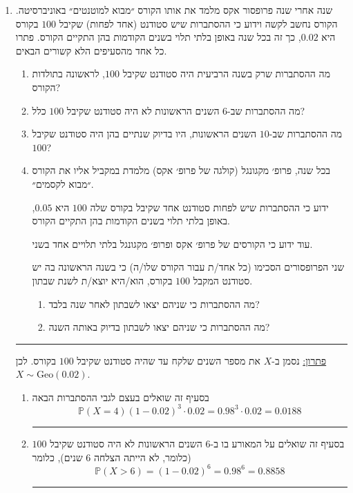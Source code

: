 \documentclass[12pt, a4paper]{article}
\newcommand{\PP}{\mathbb{P}}
\newcommand{\Geo}{\mathrm{Geo}}
\begin{document}
\begin{enumerate}

\item
שנה אחרי שנה פרופסור אקס מלמד את אותו הקורס ״מבוא למוטנטים״ באוניברסיטה.  
הקורס נחשב לקשה וידוע כי ההסתברות שיש סטודנט (אחד לפחות) שקיבל
$100$
בקורס היא
$0.02$,
כך זה בכל שנה באופן בלתי תלוי בשנים הקודמות בהן התקיים הקורס.
פתרו כל אחד מהסעיפים הלא קשורים הבאים.
\begin{enumerate}
\item
מה ההסתברות שרק בשנה הרביעית היה סטודנט שקיבל
$100$,
לראשונה בתולדות הקורס?
\item
מה ההסתברות שב-$6$
השנים הראשונות לא היה סטודנט שקיבל
$100$
כלל?
\item
מה ההסתברות שב-$10$ השנים הראשונות, היו בדיוק שנתיים בהן היה סטודנט שקיבל 
$100$?
\item
 בכל שנה,
 פרופ׳ מקגונגל (קולגה של פרופ׳ אקס) מלמדת במקביל אליו את הקורס ״מבוא לקסמים״.
 
ידוע כי  ההסתברות שיש לפחות סטודנט אחד שקיבל בקורס שלה
$100$
היא
$0.05$,
באופן בלתי תלוי בשנים הקודמות בהן התקיים הקורס.

עוד ידוע כי הקורסים של פרופ׳ אקס ופרופ׳ מקגונגל  בלתי תלויים אחד בשני.

שני הפרופסורים הסכימו (כל אחד/ת עבור הקורס שלו/ה) כי בשנה הראשונה  בה יש סטודנט המקבל
$100$
בקורס, הוא/היא יוצא/ת לשנת שבתון. 
\begin{enumerate}
\item[(i)]
מה ההסתברות כי שניהם יצאו לשבתון לאחר שנה בלבד?
\item[(ii)]
מה ההסתברות כי שניהם יצאו לשבתון בדיוק באותה השנה? 
\end{enumerate}
\end{enumerate}

\noindent\rule{15cm}{0.4pt}

\underline{פתרון:}
נסמן ב-$X$
את מספר השנים שלקח עד שהיה סטודנט שקיבל
$100$
בקורס. לכן
$X\sim \Geo(0.02)$.
\begin{enumerate}
\item
בסעיף זה שואלים בעצם לגבי ההסתברות הבאה
$$\PP(X=4)
(1-0.02)^3\cdot 0.02=0.98^3\cdot 0.02=
0.0188$$

\noindent\rule{15cm}{0.4pt}

\item
בסעיף זה שואלים על המאורע בו ב-$6$
השנים הראשונות לא היה סטודנט שקיבל 
$100$
(כלומר, לא הייתה הצלחה $6$
שנים), כלומר
$$\PP(X>6)=(1-0.02)^6=0.98^6=0.8858$$

\noindent\rule{15cm}{0.4pt}


\end{enumerate}
\end{enumerate}
\end{document}
